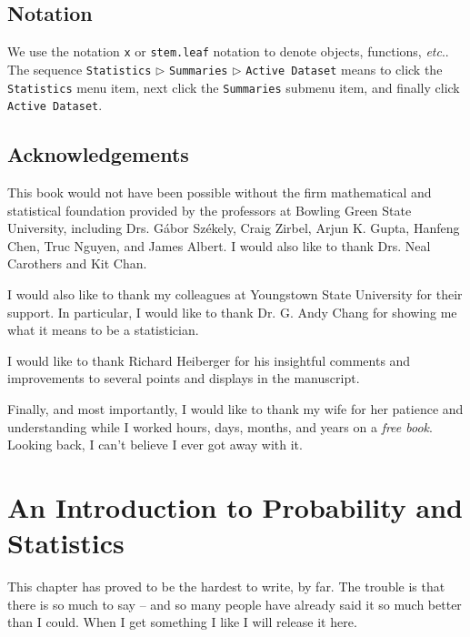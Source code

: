 \documentclass[captions=tableheading]{scrbook}
\begin{document}
\section*{Notation}

We use the notation \texttt{x} or \texttt{stem.leaf} notation to denote objects, functions, \emph{etc}.. The sequence \texttt{Statistics} \(\triangleright\) \texttt{Summaries} \(\triangleright\) \texttt{Active Dataset} means to click the \texttt{Statistics} menu item, next click the \texttt{Summaries} submenu item, and finally click \texttt{Active Dataset}.

\section*{Acknowledgements}

This book would not have been possible without the firm mathematical and statistical foundation provided by the professors at Bowling Green State University, including Drs. G\'{a}{}bor Sz\'{e}{}kely, Craig Zirbel, Arjun K. Gupta, Hanfeng Chen, Truc Nguyen, and James Albert. I would also like to thank Drs. Neal Carothers and Kit Chan. 

I would also like to thank my colleagues at Youngstown State University for their support. In particular, I would like to thank Dr. G. Andy Chang for showing me what it means to be a statistician.

I would like to thank Richard Heiberger for his insightful comments and improvements to several points and displays in the manuscript. 

Finally, and most importantly, I would like to thank my wife for her patience and understanding while I worked hours, days, months, and years on a \emph{free book}. Looking back, I can't believe I ever got away with it.

\vfill{}
\cleardoublepage
{}
{}
\listoffigures

\vfill{}
\cleardoublepage
{}
{}
\listoftables



\chapter{An Introduction to Probability and Statistics}
\label{sec-1}


\noindent 
This chapter has proved to be the hardest to write, by far. The trouble is that there is so much to say -- and so many people have already said it so much better than I could. When I get something I like I will release it here.
\end{document}
